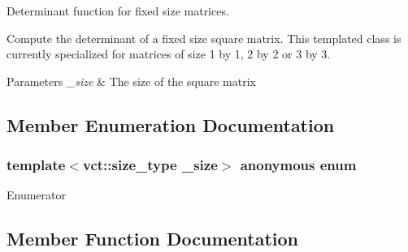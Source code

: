 Determinant function for fixed size matrices. 

Compute the determinant of a fixed size square matrix. This templated class is currently specialized for matrices of size 1 by 1, 2 by 2 or 3 by 3.


\begin{DoxyParams}{Parameters}
{\em \+\_\+size} & The size of the square matrix \\
\hline
\end{DoxyParams}


\subsection{Member Enumeration Documentation}
\hypertarget{classvct_determinant_a0d11bb9b2c0545dde730acad696bb723}{}\subsubsection[{anonymous enum}]{\setlength{\rightskip}{0pt plus 5cm}template$<$vct\+::size\+\_\+type \+\_\+size$>$ anonymous enum}\label{classvct_determinant_a0d11bb9b2c0545dde730acad696bb723}
\begin{Desc}
\item[Enumerator]\par
\begin{description}
\item[{\em 
\hypertarget{classvct_determinant_a0d11bb9b2c0545dde730acad696bb723af5935306ad86f093f0b4b547d12cf2c6}{}S\+I\+Z\+E\label{classvct_determinant_a0d11bb9b2c0545dde730acad696bb723af5935306ad86f093f0b4b547d12cf2c6}
}]\end{description}
\end{Desc}


\subsection{Member Function Documentation}
\hypertarget{classvct_determinant_ae742f09944e4c45d2965af557b8d818e}{}
